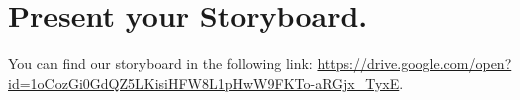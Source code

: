 \section{Present your Storyboard.}
\label{s_4}

You can find our storyboard in the following link: 
\url{https://drive.google.com/open?id=1oCozGi0GdQZ5LKisiHFW8L1pHwW9FKTo-aRGjx_TyxE}.


